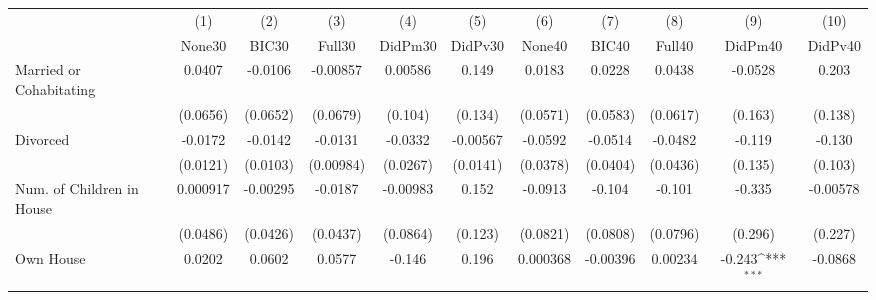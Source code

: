 {
\def\sym#1{\ifmmode^{#1}\else\(^{#1}\)\fi}
\begin{tabular}{l*{10}{c}}
\toprule
            &\multicolumn{1}{c}{(1)}&\multicolumn{1}{c}{(2)}&\multicolumn{1}{c}{(3)}&\multicolumn{1}{c}{(4)}&\multicolumn{1}{c}{(5)}&\multicolumn{1}{c}{(6)}&\multicolumn{1}{c}{(7)}&\multicolumn{1}{c}{(8)}&\multicolumn{1}{c}{(9)}&\multicolumn{1}{c}{(10)}\\
            &\multicolumn{1}{c}{None30}&\multicolumn{1}{c}{BIC30}&\multicolumn{1}{c}{Full30}&\multicolumn{1}{c}{DidPm30}&\multicolumn{1}{c}{DidPv30}&\multicolumn{1}{c}{None40}&\multicolumn{1}{c}{BIC40}&\multicolumn{1}{c}{Full40}&\multicolumn{1}{c}{DidPm40}&\multicolumn{1}{c}{DidPv40}\\
\midrule
Married or Cohabitating&      0.0407         &     -0.0106         &    -0.00857         &     0.00586         &       0.149         &      0.0183         &      0.0228         &      0.0438         &     -0.0528         &       0.203         \\
            &    (0.0656)         &    (0.0652)         &    (0.0679)         &     (0.104)         &     (0.134)         &    (0.0571)         &    (0.0583)         &    (0.0617)         &     (0.163)         &     (0.138)         \\
\addlinespace
Divorced    &     -0.0172         &     -0.0142         &     -0.0131         &     -0.0332         &    -0.00567         &     -0.0592         &     -0.0514         &     -0.0482         &      -0.119         &      -0.130         \\
            &    (0.0121)         &    (0.0103)         &   (0.00984)         &    (0.0267)         &    (0.0141)         &    (0.0378)         &    (0.0404)         &    (0.0436)         &     (0.135)         &     (0.103)         \\
\addlinespace
Num. of Children in House&    0.000917         &    -0.00295         &     -0.0187         &    -0.00983         &       0.152         &     -0.0913         &      -0.104         &      -0.101         &      -0.335         &    -0.00578         \\
            &    (0.0486)         &    (0.0426)         &    (0.0437)         &    (0.0864)         &     (0.123)         &    (0.0821)         &    (0.0808)         &    (0.0796)         &     (0.296)         &     (0.227)         \\
\addlinespace
Own House   &      0.0202         &      0.0602         &      0.0577         &      -0.146         &       0.196         &    0.000368         &    -0.00396         &     0.00234         &      -0.243\sym{***}&     -0.0868         \\

\end{tabular}}
